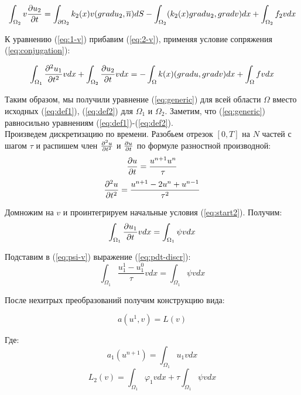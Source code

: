 \begin{equation}
    \int_{\Omega_2} v{\frac{\partial u_2}{\partial t}} = \int_{{\partial \Omega}_2} k_2(x)v(grad u_2, \overline{n})dS - \int_{\Omega_2}(k_2(x) gradu_2, grad v) dx + \int_{\Omega_2} f_2vdx
    \label{eq:2-v}
\end{equation}


К уравнению (\ref{eq:1-v}) прибавим (\ref{eq:2-v}), применяя условие сопряжения (\ref{eq:conjugation}):

\begin{equation}
    \int_{\Omega_1} {\frac{\partial^2 u_1}{\partial t^2}} v dx + \int_{\Omega_2}{\frac{\partial u_2}{\partial t}}vdx  = -\int_{\Omega} k(x)(gradu, gradv)dx + \int_{\Omega} fv dx
    \label{eq:generic}
\end{equation}


Таким образом, мы получили уравнение (\ref{eq:generic}) для всей области $\Omega$ вместо
исходных (\ref{eq:def1}), (\ref{eq:def2}) для $\Omega_1$ и $\Omega_2$. Заметим, что (\ref{eq:generic}) равносильно уравнениям (\ref{eq:def1})-(\ref{eq:def2}).\\

Произведем дискретизацию по времени. Разобьем отрезок $[0, T]$ на $N$ частей с шагом $\tau$
и распишем член ${\frac{\partial^2 u}{\partial t^2}}$ и ${\frac{\partial u}{\partial t}}$ по формуле разностной производной:
\begin{equation}
     {\frac{\partial u}{\partial t}} = \frac{u^{n+1}u^{n}}{\tau} 
     \label{eq:pdt-discr}
\end{equation}
\begin{equation}
     {\frac{\partial^2 u}{\partial t^2}} = \frac{u^{n+1} - 2 u^n + u^{n-1}}{\tau^2} 
     \label{eq:pdtt-discr}
\end{equation}

Домножим на $v$ и проинтегрируем начальные условия (\ref{eq:start2}). Получим:
\begin{equation}
    \int_{\Omega_1}{\frac{\partial u_1}{\partial t}}vdx = \int_{\Omega_1}\psi vdx
    \label{eq:psi-v}
\end{equation}

Подставим в (\ref{eq:psi-v}) выражение (\ref{eq:pdt-discr}):
$$\int_{\Omega_1} \frac{u_1^1-u_1^0}{\tau}vdx = \int_{\Omega_1}\psi vdx $$

После нехитрых преобразований получим конструкцию вида:

\begin{equation}
     a(u^{1}, v) = L(v) 
     \label{eq:al-first-layer}
\end{equation}


Где:
$$ a_1(u^{n + 1}) = \int_{\Omega_1}u_1vdx $$
$$ L_2(v) = \int_{\Omega_1}\varphi_1 vdx + \tau\int_{\Omega_1}\psi vdx $$

